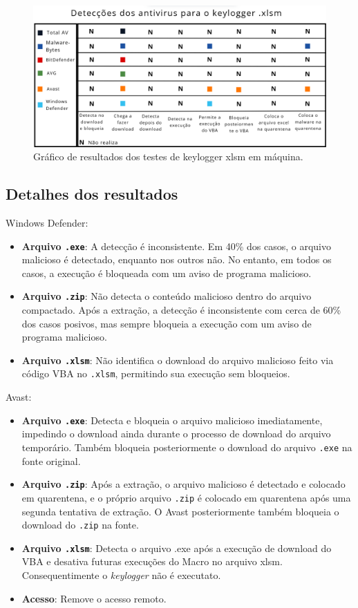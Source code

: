 \documentclass[12pt]{article}
\begin{document}
\begin{figure}[H]
    \centering
    \includegraphics[width=1.0\textwidth]{imgs/xlsmtabelaresultado.png} 
    \caption{Gráfico de resultados dos testes de keylogger xlsm em máquina.}
\end{figure}



\subsection*{Detalhes dos resultados}
Windows Defender:
\begin{itemize}
    \item \textbf{Arquivo \texttt{.exe}}: A detecção é inconsistente. Em 40\% dos casos, o arquivo malicioso é detectado, enquanto nos outros não. No entanto, em todos os casos, a execução é bloqueada com um aviso de programa malicioso.
    \item \textbf{Arquivo \texttt{.zip}}: Não detecta o conteúdo malicioso dentro do arquivo compactado. Após a extração, a detecção é inconsistente com cerca de 60\% dos casos posivos, mas sempre bloqueia a execução com um aviso de programa malicioso.
    \item \textbf{Arquivo \texttt{.xlsm}}: Não identifica o download do arquivo malicioso feito via código VBA no \texttt{.xlsm}, permitindo sua execução sem bloqueios.
\end{itemize}

\noindent Avast:
\begin{itemize}
    \item \textbf{Arquivo \texttt{.exe}}: Detecta e bloqueia o arquivo malicioso imediatamente, impedindo o download ainda durante o processo de download do arquivo temporário. Também bloqueia posteriormente o download do arquivo \texttt{.exe} na fonte original.
    \item \textbf{Arquivo \texttt{.zip}}: Após a extração, o arquivo malicioso é detectado e colocado em quarentena, e o próprio arquivo \texttt{.zip} é colocado em quarentena após uma segunda tentativa de extração. O Avast posteriormente também bloqueia o download do \texttt{.zip} na fonte.
    \item \textbf{Arquivo \texttt{.xlsm}}:  Detecta o arquivo .exe após a execução de download do VBA e desativa futuras execuções do Macro no arquivo xlsm. Consequentimente o \textit{keylogger} não é executato.
    \item \textbf{Acesso}: Remove o acesso remoto.
\end{itemize}
\end{document}
